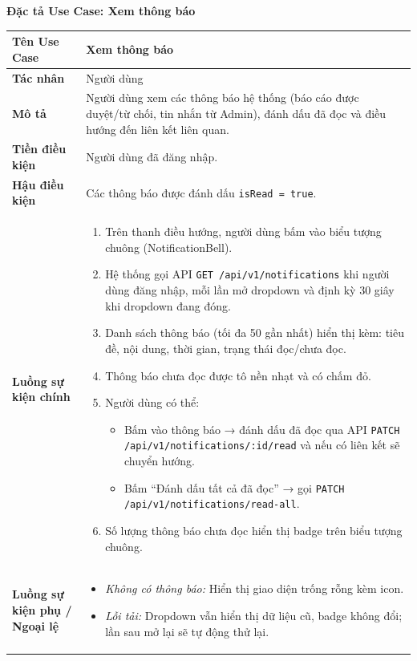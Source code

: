 \documentclass[12pt,a4paper]{article}
\begin{document}
\vspace{0.5cm}
\textbf{Đặc tả Use Case: Xem thông báo}

\begin{center}
\renewcommand{\arraystretch}{1.4}
\begin{tabular}{|p{4cm}|p{10cm}|}
\hline
\rowcolor{blue!15}
\textbf{Tên Use Case} & \textbf{Xem thông báo} \\ \hline
\textbf{Tác nhân} & Người dùng \\ \hline
\textbf{Mô tả} & Người dùng xem các thông báo hệ thống (báo cáo được duyệt/từ chối, tin nhắn từ Admin), đánh dấu đã đọc và điều hướng đến liên kết liên quan. \\ \hline
\textbf{Tiền điều kiện} & Người dùng đã đăng nhập. \\ \hline
\textbf{Hậu điều kiện} & Các thông báo được đánh dấu \texttt{isRead = true}. \\ \hline
\textbf{Luồng sự kiện chính} & 
\begin{enumerate}
    \item Trên thanh điều hướng, người dùng bấm vào biểu tượng chuông (NotificationBell).
    \item Hệ thống gọi API \texttt{GET /api/v1/notifications} khi người dùng đăng nhập, mỗi lần mở dropdown và định kỳ 30 giây khi dropdown đang đóng.
    \item Danh sách thông báo (tối đa 50 gần nhất) hiển thị kèm: tiêu đề, nội dung, thời gian, trạng thái đọc/chưa đọc.
    \item Thông báo chưa đọc được tô nền nhạt và có chấm đỏ.
    \item Người dùng có thể:
        \begin{itemize}
            \item Bấm vào thông báo → đánh dấu đã đọc qua API \texttt{PATCH /api/v1/notifications/:id/read} và nếu có liên kết sẽ chuyển hướng.
            \item Bấm “Đánh dấu tất cả đã đọc” → gọi \texttt{PATCH /api/v1/notifications/read-all}.
        \end{itemize}
    \item Số lượng thông báo chưa đọc hiển thị badge trên biểu tượng chuông.
\end{enumerate} \\ \hline
\textbf{Luồng sự kiện phụ / Ngoại lệ} & 
\begin{itemize}
    \item \textit{Không có thông báo:} Hiển thị giao diện trống rỗng kèm icon.
    \item \textit{Lỗi tải:} Dropdown vẫn hiển thị dữ liệu cũ, badge không đổi; lần sau mở lại sẽ tự động thử lại.
\end{itemize} \\ \hline
\end{tabular}
\end{center}
\end{document}
